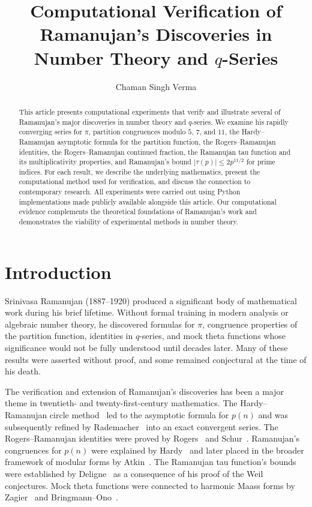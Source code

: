 \documentclass[10pt]{amsart}
\title[Ramanujan's Mathematics and Computational Verification]{
Computational Verification of Ramanujan's Discoveries in Number Theory
and $q$-Series}
\author{Chaman Singh Verma}
\theoremstyle{plain}
\theoremstyle{definition}
\theoremstyle{remark}
\begin{document}
\begin{abstract}
This article presents computational experiments that verify and
illustrate several of Ramanujan's major discoveries in
number theory and $q$-series. We examine his rapidly converging series
for $\pi$, partition congruences modulo $5$, $7$, and $11$, the
Hardy--Ramanujan asymptotic formula for the partition function, the
Rogers--Ramanujan identities, the Rogers--Ramanujan continued fraction,
the Ramanujan tau function and its multiplicativity properties, and
Ramanujan's bound $|\tau(p)| \leq 2p^{11/2}$ for prime indices. For
each result, we describe the underlying mathematics, present the
computational method used for verification, and discuss the connection
to contemporary research. All experiments were carried out using Python
implementations made publicly available alongside this article. Our
computational evidence complements the theoretical foundations of
Ramanujan's work and demonstrates the viability of experimental
methods in number theory.
\end{abstract}

\maketitle

\section{Introduction}

Srinivasa Ramanujan (1887--1920) produced a significant body of
mathematical work during his brief lifetime. Without formal training in
modern analysis or algebraic number theory, he discovered formulas for
$\pi$, congruence properties of the partition function, identities in
$q$-series, and mock theta functions whose significance would not be
fully understood until decades later. Many of these results were
asserted without proof, and some remained conjectural at the time of
his death.

The verification and extension of Ramanujan's discoveries has been a
major theme in twentieth- and twenty-first-century mathematics. The
Hardy--Ramanujan circle method~\cite{hardy_ramanujan_1918} led to the
asymptotic formula for $p(n)$ and was subsequently refined by
Rademacher~\cite{rademacher_1937} into an exact convergent series. The
Rogers--Ramanujan identities were proved by Rogers~\cite{rogers_1894}
and Schur~\cite{schur_1917}. Ramanujan's congruences for $p(n)$ were
explained by Hardy~\cite{hardy_1921} and later placed in the broader
framework of modular forms by Atkin~\cite{atkin_1966}. The Ramanujan
tau function's bounds were established by Deligne~\cite{deligne_1974}
as a consequence of his proof of the Weil conjectures. Mock theta
functions were connected to harmonic Maass forms by Zagier~\cite{zagier_2010}
and Bringmann--Ono~\cite{bringmann_ono_2010}.
\end{document}
